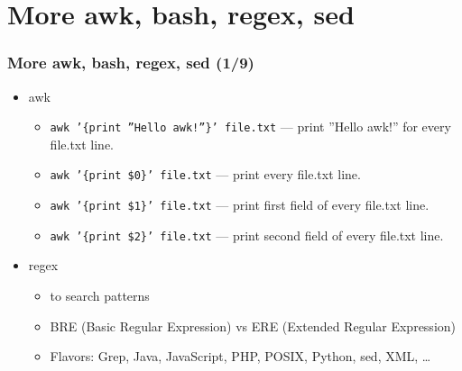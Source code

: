 \documentclass[aspectratio=169, xcolor=table, notheorems, hyperref={pdfpagelabels=false}]{beamer}
\begin{document}
\section{More awk, bash, regex, sed}
\begin{frame}[fragile]
\frametitle{More awk, bash, regex, sed (1/9)}
\begin{itemize}
\item awk
\begin{itemize}
\item \texttt{awk '\{print ''Hello awk!''\}' file.txt} --- print ''Hello awk!'' for every file.txt line.
\item \texttt{awk '\{print \$0\}' file.txt} --- print every file.txt line.
\item \texttt{awk '\{print \$1\}' file.txt} --- print first field of every file.txt line.
\item \texttt{awk '\{print \$2\}' file.txt} --- print second field of every file.txt line.
\end{itemize}
\item regex
\begin{itemize}
\item to search patterns
\item BRE (Basic Regular Expression) vs ERE (Extended Regular Expression)
\item Flavors: Grep, Java, JavaScript, PHP, POSIX, Python, sed, XML, \ldots
\end{itemize}
\end{itemize}
\end{frame}
\end{document}

